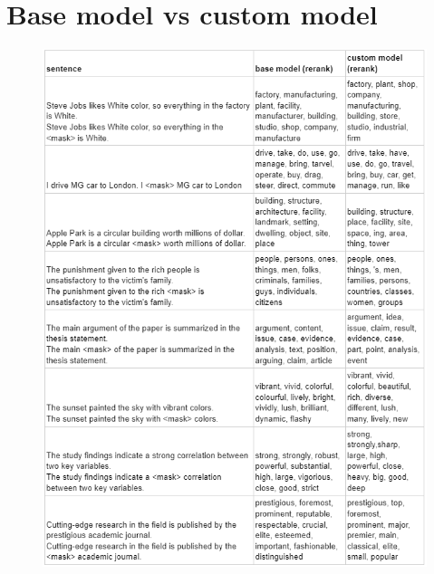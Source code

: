 \documentclass[12pt,oneside,openright,a4paper]{cpe-english-project}
\begin{document}
\section{Base model vs custom model}
\begin{figure}[!h]\centering
\includegraphics{./img/Appendix/BasevsCustom.png}
\end{figure}

\newpage
\end{document}

